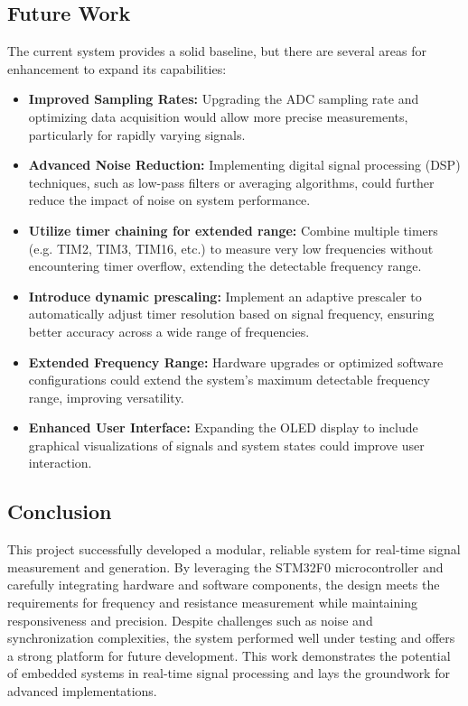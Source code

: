 \subsection{Future Work}
The current system provides a solid baseline, but there are several areas for enhancement to expand its capabilities:
\begin{itemize}[leftmargin=2em]
    \item \textbf{Improved Sampling Rates:} Upgrading the ADC sampling rate and optimizing data acquisition would allow more precise measurements, particularly for rapidly varying signals.
    \item \textbf{Advanced Noise Reduction:} Implementing digital signal processing (DSP) techniques, such as low-pass filters or averaging algorithms, could further reduce the impact of noise on system performance.
    \item \textbf{Utilize timer chaining for extended range:} Combine multiple timers (e.g. TIM2, TIM3, TIM16, etc.) to measure very low frequencies without encountering timer overflow, extending the detectable frequency range.
    \item \textbf{Introduce dynamic prescaling:} Implement an adaptive prescaler to automatically adjust timer resolution based on signal frequency, ensuring better accuracy across a wide range of frequencies.
    \item \textbf{Extended Frequency Range:} Hardware upgrades or optimized software configurations could extend the system's maximum detectable frequency range, improving versatility.
    \item \textbf{Enhanced User Interface:} Expanding the OLED display to include graphical visualizations of signals and system states could improve user interaction.
\end{itemize}

\subsection{Conclusion}
This project successfully developed a modular, reliable system for real-time signal measurement and generation. By leveraging the STM32F0 microcontroller and carefully integrating hardware and software components, the design meets the requirements for frequency and resistance measurement while maintaining responsiveness and precision. Despite challenges such as noise and synchronization complexities, the system performed well under testing and offers a strong platform for future development. This work demonstrates the potential of embedded systems in real-time signal processing and lays the groundwork for advanced implementations.
